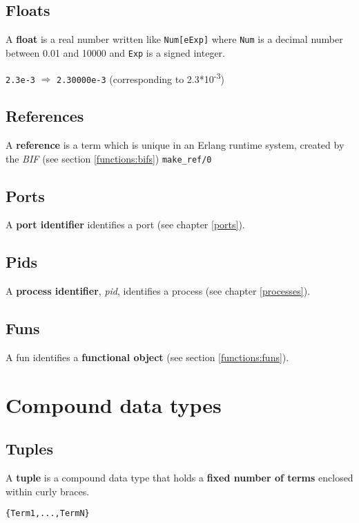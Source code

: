 \subsection{Floats}
\label{datatypes:float}
A \textbf{float} is a real number written like \texttt{Num[eExp]}
where \texttt{Num} is a decimal number between 0.01 and 10000 and
\texttt{Exp} is a signed integer.

\texttt{2.3e-3} $\Rightarrow$ \texttt{2.30000e-3}
(corresponding to 2.3*10\textsuperscript{-3})


\subsection{References}
\label{datatypes:reference}
A \textbf{reference} is a term which is unique in an Erlang runtime
system, created by the \textit{BIF} (see section \ref{functions:bifs})
\texttt{make\_ref/0}


\subsection{Ports}
\label{datatypes:port}
A \textbf{port identifier} identifies a port (see chapter \ref{ports}).


\subsection{Pids}
\label{datatypes:pid}
A \textbf{process identifier}, \textit{pid}, identifies a process (see
chapter \ref{processes}).


\subsection{Funs}
\label{datatypes:fun}
A fun identifies a \textbf{functional object} (see section
\ref{functions:funs}).


\section{Compound data types}

\subsection{Tuples}
\label{datatypes:tuple}
A \textbf{tuple} is a compound data type that holds a \textbf{fixed
number of terms} enclosed within curly braces.

\texttt{\{Term1,...,TermN\}}

